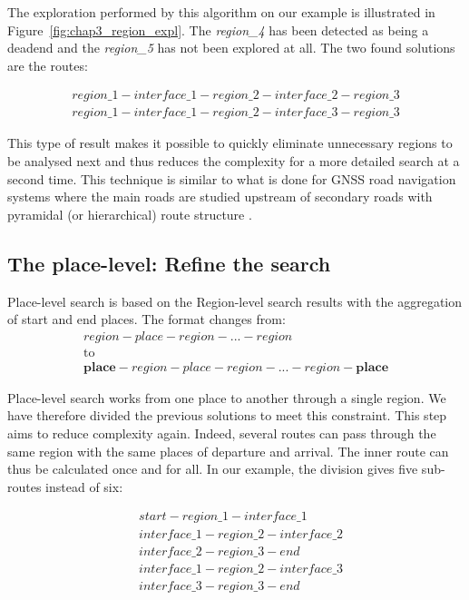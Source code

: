 The exploration performed by this algorithm on our example is illustrated in Figure~\ref{fig:chap3_region_expl}. The \textit{region\_4} has been detected as being a deadend and the \textit{region\_5} has not been explored at all. The two found solutions are the routes:

\begin{align*}
region\_1 - interface\_1 - region\_2 - interface\_2 - region\_3 \\
region\_1 - interface\_1 - region\_2 - interface\_3 - region\_3
\end{align*}

This type of result makes it possible to quickly eliminate unnecessary regions to be analysed next and thus reduces the complexity for a more detailed search at a second time. This technique is similar to what is done for GNSS road navigation systems where the main roads are studied upstream of secondary roads with pyramidal (or hierarchical) route structure \cite{bovy_2012_route}.

\subsection{The place-level: Refine the search}

Place-level search is based on the Region-level search results with the aggregation of start and end places. The format changes from:
\begin{gather*}
region - place - region - ... - region \\
\text{to} \\
\textbf{place} - region - place - region - ... - region - \textbf{place}
\end{gather*}

Place-level search works from one place to another through a single region. We have therefore divided the previous solutions to meet this constraint. This step aims to reduce complexity again. Indeed, several routes can pass through the same region with the same places of departure and arrival. The inner route can thus be calculated once and for all. In our example, the division gives five sub-routes instead of six:

\begin{align*}
&start - region\_1 - interface\_1 \\
&interface\_1 - region\_2 - interface\_2 \\
&interface\_2 - region\_3 - end \\
&interface\_1 - region\_2 - interface\_3 \\
&interface\_3 - region\_3 - end
\end{align*}

